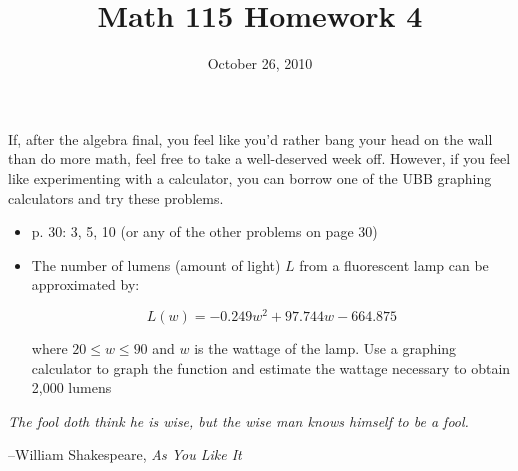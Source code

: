 \documentclass[fleqn,addpoints]{exam}
\title{Math 115 Homework 4}
\date{October 26, 2010}
\begin{document}
\maketitle
 
If, after the algebra final, you feel like you'd rather bang your head on the wall than do more math, feel free to take a
well-deserved week off.  However, if you feel like experimenting with a calculator, you can borrow one of the UBB
graphing calculators and try these problems.

\begin{itemize}
\item p. 30: 3, 5, 10 (or any of the other problems on page 30)

\item 
The number of lumens (amount of light) $L$ from a fluorescent lamp can be approximated by:

\[
  L(w) = -0.249w^2 + 97.744w - 664.875
\]

where $20 \leq w \leq 90$ and $w$ is the wattage of the lamp.  Use a graphing calculator to graph the function and
estimate the wattage necessary to obtain 2,000 lumens

\end{itemize}


\ifprintanswers
\else
\vspace{4 in}


{\em The fool doth think he is wise, but the wise man knows himself to be a fool.}

\vspace{.1 cm}
\hspace{1 cm} --William Shakespeare, {\em As You Like It}

\fi
\end{document}
